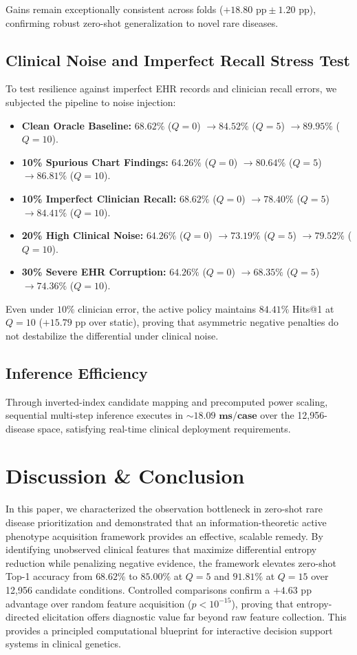 \documentclass[conference]{IEEEtran}
\begin{document}
Gains remain exceptionally consistent across folds ($+18.80\text{ pp} \pm 1.20\text{ pp}$), confirming robust zero-shot generalization to novel rare diseases.

\subsection{Clinical Noise and Imperfect Recall Stress Test}
To test resilience against imperfect EHR records and clinician recall errors, we subjected the pipeline to noise injection:
\begin{itemize}
    \item \textbf{Clean Oracle Baseline:} $68.62\%$ ($Q=0$) $\rightarrow 84.52\%$ ($Q=5$) $\rightarrow 89.95\%$ ($Q=10$).
    \item \textbf{10\% Spurious Chart Findings:} $64.26\%$ ($Q=0$) $\rightarrow 80.64\%$ ($Q=5$) $\rightarrow 86.81\%$ ($Q=10$).
    \item \textbf{10\% Imperfect Clinician Recall:} $68.62\%$ ($Q=0$) $\rightarrow 78.40\%$ ($Q=5$) $\rightarrow 84.41\%$ ($Q=10$).
    \item \textbf{20\% High Clinical Noise:} $64.26\%$ ($Q=0$) $\rightarrow 73.19\%$ ($Q=5$) $\rightarrow 79.52\%$ ($Q=10$).
    \item \textbf{30\% Severe EHR Corruption:} $64.26\%$ ($Q=0$) $\rightarrow 68.35\%$ ($Q=5$) $\rightarrow 74.36\%$ ($Q=10$).
\end{itemize}
Even under $10\%$ clinician error, the active policy maintains $84.41\%$ Hits@1 at $Q=10$ ($+15.79\text{ pp}$ over static), proving that asymmetric negative penalties do not destabilize the differential under clinical noise.

\subsection{Inference Efficiency}
Through inverted-index candidate mapping and precomputed power scaling, sequential multi-step inference executes in $\mathbf{\sim 18.09\text{ ms/case}}$ over the 12,956-disease space, satisfying real-time clinical deployment requirements.

\section{Discussion \& Conclusion}

In this paper, we characterized the observation bottleneck in zero-shot rare disease prioritization and demonstrated that an information-theoretic active phenotype acquisition framework provides an effective, scalable remedy. By identifying unobserved clinical features that maximize differential entropy reduction while penalizing negative evidence, the framework elevates zero-shot Top-1 accuracy from $68.62\%$ to $85.00\%$ at $Q=5$ and $91.81\%$ at $Q=15$ over 12,956 candidate conditions. Controlled comparisons confirm a $+4.63\text{ pp}$ advantage over random feature acquisition ($p < 10^{-15}$), proving that entropy-directed elicitation offers diagnostic value far beyond raw feature collection. This provides a principled computational blueprint for interactive decision support systems in clinical genetics.
\end{document}
